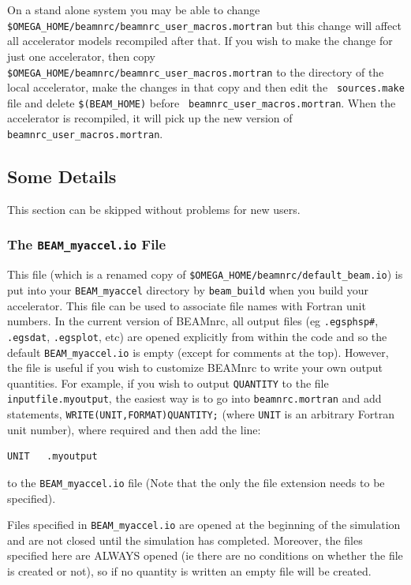 \documentclass[12pt,twoside]{article}
\begin{document}
On a stand alone system you may be able to change\\
{\tt \$OMEGA\_HOME/beamnrc/beamnrc\_user\_macros.mortran} but this change
will affect all accelerator models recompiled after that.  If you
wish to make the change for just one accelerator, then copy {\tt
\$OMEGA\_HOME/beamnrc/beamnrc\_user\_macros.mortran} to the directory of
the local accelerator, make the changes in that copy and then edit the {\tt
sources.make} file and delete {\tt \$(BEAM\_HOME)} before {\tt
beamnrc\_user\_macros.mortran}.  When the accelerator is recompiled, it
will pick up the new version of {\tt beamnrc\_user\_macros.mortran}.

\subsection{Some Details}
\label{od}

This section can be skipped without problems for new users.

\subsubsection{The {\tt BEAM\_myaccel.io} File}
\label{iofilesect}
This file (which is a renamed copy of
{\tt \$OMEGA\_HOME/beamnrc/default\_beam.io}) is put into your
{\tt BEAM\_myaccel} directory by {\tt beam\_build}
when you build your accelerator.  This file can be used to associate
file names with Fortran unit numbers.  In the current version of
BEAMnrc, all output files (eg {\tt .egsphsp\#}, {\tt .egsdat}, {\tt .egsplot},
etc) are opened explicitly from within the code and so the default
{\tt BEAM\_myaccel.io} is empty (except for comments at the top).  However,
the file is useful if you wish to customize BEAMnrc to write your own
output quantities.  For example, if you wish to output {\tt QUANTITY} to
the file {\tt inputfile.myoutput}, the easiest way is to go into
{\tt beamnrc.mortran} and add statements, {\tt WRITE(UNIT,FORMAT)QUANTITY;}
(where {\tt UNIT} is an arbitrary Fortran unit number), where required and then
add the line:
\begin{verbatim}
UNIT   .myoutput
\end{verbatim}
to the {\tt BEAM\_myaccel.io} file (Note that the only the file extension
needs to be specified).

Files specified in
{\tt BEAM\_myaccel.io} are opened at the beginning of the simulation
and are not closed until the simulation has completed.  Moreover, the files
specified here are ALWAYS opened (ie there are no conditions on whether
the file is created or not), so if no quantity is written an empty
file will be created.
\end{document}
